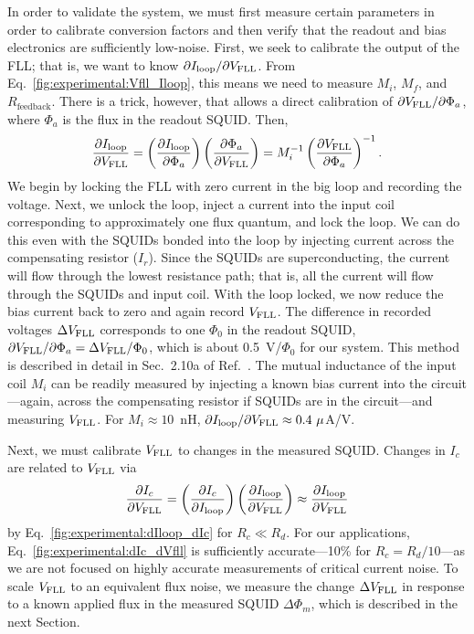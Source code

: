 In order to validate the system, we must first measure certain parameters in order to calibrate conversion factors and then verify that the readout and bias electronics are sufficiently low-noise. First, we seek to calibrate the output of the FLL; that is, we want to know $\partial I_\text{loop}/\partial V_\text{FLL}$. From Eq.~\eqref{fig:experimental:Vfll_Iloop}, this means we need to measure $M_i$, $M_f$, and $R_{\text{feedback}}$. There is a trick, however, that allows a direct calibration of $\partial V_\text{FLL}/\partial\Phi_a$, where $\Phi_a$ is the flux in the readout SQUID. Then,
\begin{align}\label{fig:experimental:dIloop_dVfll}
\frac{\partial\Iloop}{\partial\Vfll} = \left(\frac{\partial\Iloop}{\partial\Phi_a}\right) \left(\frac{\partial\Phi_a}{\partial\Vfll}\right) %
= M_i^{-1} \left(\frac{\partial\Vfll}{\partial\Phi_a}\right)^{-1}.
\end{align}
We begin by locking the FLL with zero current in the big loop and recording the voltage. Next, we unlock the loop, inject a current into the input coil corresponding to approximately one flux quantum, and lock the loop. We can do this even with the SQUIDs bonded into the loop by injecting current across the compensating resistor ($I_r$). Since the SQUIDs are superconducting, the current will flow through the lowest resistance path; that is, all the current will flow through the SQUIDs and input coil. With the loop locked, we now reduce the bias current back to zero and again record $V_\text{FLL}$. The difference in recorded voltages $\Delta V_\text{FLL}$ corresponds to one $\Phi_0$ in the readout SQUID, $\partial V_\text{FLL}/\partial\Phi_a = \Delta V_\text{FLL} / \Phi_0$, which is about 0.5~V/$\Phi_0$ for our system. This method is described in detail in Sec.~2.10a of Ref.~\citep{Wellstood:thesis}. The mutual inductance of the input coil $M_i$ can be readily measured by injecting a known bias current into the circuit---again, across the compensating resistor if SQUIDs are in the circuit---and measuring $V_\text{FLL}$. For $M_i \approx 10$~nH, $\partial I_\text{loop}/\partial V_\text{FLL} \approx 0.4~\mu$A/V.

Next, we must calibrate $V_\text{FLL}$ to changes in the measured SQUID. Changes in $I_c$ are related to $V_\text{FLL}$ via
\begin{align}\label{fig:experimental:dIc_dVfll}
\frac{\partial I_c}{\partial\Vfll} = \left(\frac{\partial I_c}{\partial\Iloop}\right) \left(\frac{\partial\Iloop}{\partial\Vfll}\right) %
\approx \frac{\partial\Iloop}{\partial\Vfll}
\end{align}
by Eq.~\eqref{fig:experimental:dIloop_dIc} for $R_c \ll R_d$. For our applications, Eq.~\eqref{fig:experimental:dIc_dVfll} is sufficiently accurate---10\% for $R_c = R_d/10$---as we are not focused on highly accurate measurements of critical current noise. To scale $V_\text{FLL}$ to an equivalent flux noise, we measure the change $\Delta V_\text{FLL}$ in response to a known applied flux in the measured SQUID $\Delta\Phi_m$, which is described in the next Section.

